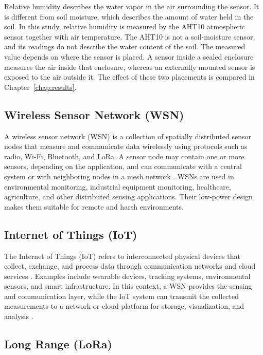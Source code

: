 Relative humidity describes the water vapor in the air surrounding the sensor. It is different from soil moisture, which describes the amount of water held in the soil. In this study, relative humidity is measured by the AHT10 atmospheric sensor together with air temperature. The AHT10 is not a soil-moisture sensor, and its readings do not describe the water content of the soil. The measured value depends on where the sensor is placed. A sensor inside a sealed enclosure measures the air inside that enclosure, whereas an externally mounted sensor is exposed to the air outside it. The effect of these two placements is compared in Chapter~\ref{chap:results}.

\subsection{Wireless Sensor Network (WSN)}

A wireless sensor network (WSN) is a collection of spatially distributed
sensor nodes that measure and communicate data wirelessly using protocols
such as radio, Wi-Fi, Bluetooth, and LoRa. A sensor node may contain one
or more sensors, depending on the application, and can communicate with a
central system or with neighboring nodes in a mesh network
\cite{jung2012clusterhead,xu2014borderrouter}. WSNs are used in
environmental monitoring, industrial equipment monitoring, healthcare,
agriculture, and other distributed sensing applications. Their low-power
design makes them suitable for remote and harsh environments.

\subsection{Internet of Things (IoT)}

The Internet of Things (IoT) refers to interconnected physical devices
that collect, exchange, and process data through communication networks
and cloud services \cite{aws2024iot}. Examples include wearable devices,
tracking systems, environmental sensors, and smart infrastructure. In this
context, a WSN provides the sensing and communication layer, while the IoT
system can transmit the collected measurements to a network or cloud
platform for storage, visualization, and analysis
\cite{karthik2021iot,jebri2015iot}.

\subsection{Long Range (LoRa)}

